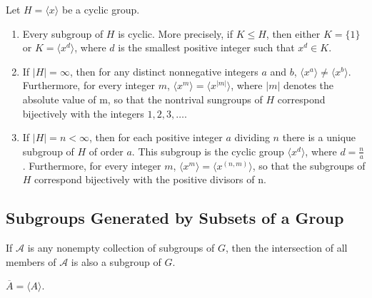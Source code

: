 \documentclass[../main]{subfiles}
\begin{document}
 \begin{thm}
  Let $H=\langle x \rangle$ be a cyclic group. 
  \begin{enumerate}
   \item Every subgroup of $H$ is cyclic. More precisely, if $K\leq H$, then either $K=\{1\}$ or $K=\langle x^d \rangle$, where $d$ is the smallest positive integer such that $x^d \in K$.
   \item If $|H| = \infty$, then for any distinct nonnegative integers $a$ and $b$, $\langle x^a \rangle \neq \langle x^b \rangle$. Furthermore, for every integer $m$, $\langle x^m \rangle = \langle x^{|m|} \rangle$, where $|m|$ denotes the absolute value of m, so that the nontrival sungroups of $H$ correspond bijectively with the integers $1,2,3,\ldots$.
   \item If $|H| = n <\infty$, then for each positive integer $a$ dividing $n$ there is a unique subgroup of $H$ of order $a$. This subgroup is the cyclic group $\langle x^d \rangle$, where $d=\frac{n}{a}$. Furthermore, for every integer $m$, $\langle x^m \rangle = \langle x^{(n,m)} \rangle$, so that the subgroups of $H$ correspond bijectively with the positive divisors of n.
  \end{enumerate}
 \end{thm}

 
 \subsection{Subgroups Generated by Subsets of a Group}
 
 
 \begin{prop}
  If $\mathcal{A}$ is any nonempty collection of subgroups of $G$, then the intersection of all members of $\mathcal{A}$ is also a subgroup of $G$.
 \end{prop}


 \begin{prop}
  $\overline{A}=\langle A \rangle$.
 \end{prop}
\end{document}
